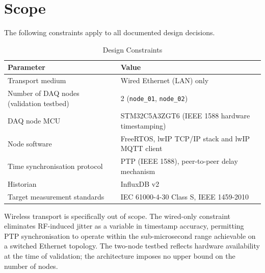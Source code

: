 \section{Scope}
The following constraints apply to all documented design decisions.

\begin{table}[H]
  \caption{Design Constraints}
  \begin{tabular}{ll}
    \hline
    \textbf{Parameter} & \textbf{Value} \\
    \hline
    Transport medium & Wired Ethernet (LAN) only \\
    Number of DAQ nodes (validation testbed) & 2 (\texttt{node\_01}, \texttt{node\_02}) \\
    DAQ node MCU & STM32C5A3ZGT6 (IEEE 1588 hardware timestamping) \\
    Node software & FreeRTOS, lwIP TCP/IP stack and lwIP MQTT client \\
    Time synchronisation protocol & PTP (IEEE 1588), peer-to-peer delay mechanism \\
    Historian & InfluxDB v2 \\
    Target measurement standards & IEC 61000-4-30 Class S, IEEE 1459-2010 \\
    \hline
  \end{tabular}
\end{table}

Wireless transport is specifically out of scope. The wired-only constraint eliminates RF-induced jitter as a variable in timestamp accuracy, permitting PTP synchronisation to operate within the sub-microsecond range achievable on a switched Ethernet topology. The two-node testbed reflects hardware availability at the time of validation; the architecture imposes no upper bound on the number of nodes.
